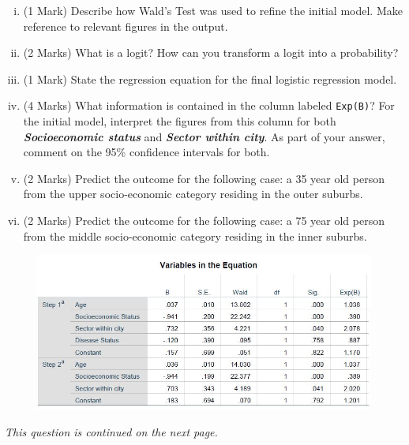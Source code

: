 \documentclass[a4paper,12pt]{article}
\begin{document}
\begin{enumerate}
\begin{enumerate}[(a)]
\begin{enumerate}[(i)]
\item (1 Mark) Describe how Wald's Test was used to refine the initial model. Make reference to relevant figures in the output.
\item (2 Marks)
What is a logit? How can you transform a logit into a probability?

\item (1 Mark) State the regression equation for the final logistic regression model.
\item (4 Marks) What information is contained in the column labeled \texttt{Exp(B)}? For the initial model, interpret the figures from this column for both \textbf{\textit{Socioeconomic status}} and \textbf{\textit{Sector within city}}. 
As part of your answer, comment on the 95\% confidence intervals for both.


\item (2 Marks) Predict the outcome for the following case: a 35 year old person from the upper socio-economic category residing in the outer suburbs.
\item (2 Marks) Predict the outcome for the following case: a 75 year old person  from the middle socio-economic category residing in the inner suburbs.

\end{enumerate}

\begin{figure}[h!]
	\centering

\includegraphics[width=1.00\linewidth]{BLR-A}\\

\end{figure}

\noindent \textit{This question is continued on the next page.}
\begin{figure}[h!]
	\centering


\end{figure}
\end{enumerate}
\end{enumerate}
\end{document}
